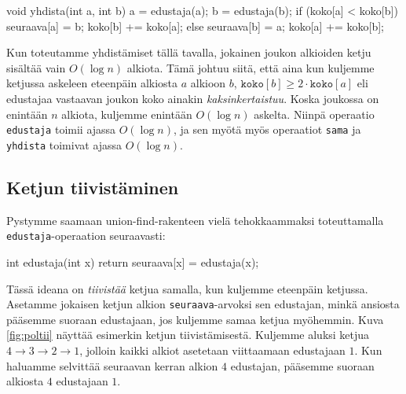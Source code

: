 \begin{code}
void yhdista(int a, int b) {
    a = edustaja(a);
    b = edustaja(b);
    if (koko[a] < koko[b]) {
        seuraava[a] = b;
        koko[b] += koko[a];
    } else {
        seuraava[b] = a;
        koko[a] += koko[b];
    }
}
\end{code}

Kun toteutamme yhdistämiset tällä tavalla, jokainen joukon
alkioiden ketju sisältää vain $O(\log n)$ alkiota.
Tämä johtuu siitä, että aina kun kuljemme ketjussa
askeleen eteenpäin alkiosta $a$ alkioon $b$,
$\texttt{koko}[b] \ge 2 \cdot \texttt{koko}[a]$ eli
edustajaa vastaavan joukon koko ainakin \emph{kaksinkertaistuu}.
Koska joukossa on enintään $n$ alkiota,
kuljemme enintään $O(\log n)$ askelta.
Niinpä operaatio \texttt{edustaja} toimii ajassa $O(\log n)$,
ja sen myötä myös operaatiot \texttt{sama} ja \texttt{yhdista}
toimivat ajassa $O(\log n)$.

\subsection{Ketjun tiivistäminen}

Pystymme saamaan union-find-rakenteen vielä tehokkaammaksi
toteuttamalla \texttt{edustaja}-operaation seuraavasti:

\begin{code}
int edustaja(int x) {
    return seuraava[x] = edustaja(x);
}
\end{code}

Tässä ideana on \emph{tiivistää} ketjua samalla,
kun kuljemme eteenpäin ketjussa.
Asetamme jokaisen ketjun alkion \texttt{seuraava}-arvoksi sen edustajan,
minkä ansiosta pääsemme suoraan edustajaan,
jos kuljemme samaa ketjua myöhemmin.
Kuva \ref{fig:poltii} näyttää esimerkin ketjun tiivistämisestä.
Kuljemme aluksi ketjua $4 \rightarrow 3 \rightarrow 2 \rightarrow 1$,
jolloin kaikki alkiot asetetaan viittaamaan edustajaan $1$.
Kun haluamme selvittää seuraavan kerran alkion $4$ edustajan,
pääsemme suoraan alkiosta $4$ edustajaan $1$.

